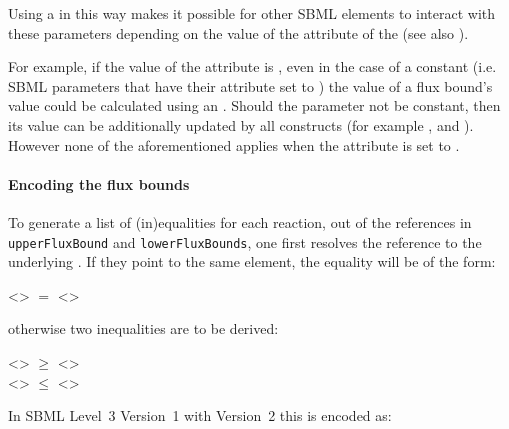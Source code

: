 Using a \Parameter in this way makes it possible for other SBML elements to interact with these parameters depending on the value of the  attribute of the \Model (see also ).

For example, if the value of the  attribute is , even in the case of a constant \Parameter (i.e. SBML parameters that have their  attribute set to ) the value of a flux bound's value could be calculated using an \InitialAssignment. Should the parameter not be constant, then its value can be additionally updated by all \sbmlthreecore constructs (for example \EventAssignment, \AssignmentRule and \AlgebraicRule). However none of the aforementioned applies when the  attribute is set to .


\paragraph{Encoding the flux bounds}
To generate a list of (in)equalities for each reaction, out of the references in \texttt{upperFluxBound} and \texttt{lowerFluxBounds}, one first resolves the reference to the underlying \Parameter
. If they point to the same element, the equality will be of the form:

<> $=$ <>

otherwise two inequalities are to be derived:

<> $\geq$ <>\\
<> $\leq$ <>

In SBML Level~3 Version~1 with \FBC Version~2 this is encoded as:
%

%
%
%

